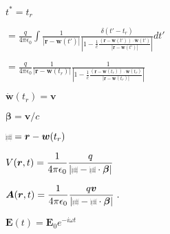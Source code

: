 \documentclass[12pt]{article}
\renewcommand{\vec}[1]{\boldsymbol{#1}}%
\def\lthtmlcheckvsize{\ifdim\ht\sizebox<\vsize 
  \ifdim\wd\sizebox<\hsize\expandafter\hfill\fi \expandafter\vfill
  \else\expandafter\vss\fi}%
\begin{document}
{\newpage\clearpage
{}%
$ t^* = t_r$%
\lthtmlindisplaymathZ
\lthtmlcheckvsize\clearpage}

{\newpage\clearpage
{}%
$\displaystyle = \frac{q}{4\pi\epsilon_0}\int \frac{ 1  }{|\vec{r} - \vec{w}(t')| }\frac{\delta(t' - t_r)}{\left| 1 - \frac{1}{c} \frac{ \left( \vec{r}  - \vec{w}(t')  \right)\cdot  \dot{\vec{w}}(t') }{ |\vec{r} - \vec{w}(t') | } \right|} dt'$%
\lthtmlindisplaymathZ
\lthtmlcheckvsize\clearpage}

{\newpage\clearpage
{}%
$\displaystyle = \frac{q}{4\pi\epsilon_0} \frac{ 1  }{|\vec{r} - \vec{w}(t_r)| }      \frac{1}{\left| 1 - \frac{1}{c} \frac{ \left( \vec{r}  - \vec{w}(t_r)  \right)\cdot  \dot{\vec{w}}(t_r) }{ |\vec{r} - \vec{w}(t_r) | } \right|}$%
\lthtmlindisplaymathZ
\lthtmlcheckvsize\clearpage}

{\newpage\clearpage
{}%
$ \dot{\vec{w}}(t_r) = \vec{v}$%
\lthtmlindisplaymathZ
\lthtmlcheckvsize\clearpage}

{\newpage\clearpage
{}%
$ \vec{\beta} = \vec{v}/c$%
\lthtmlindisplaymathZ
\lthtmlcheckvsize\clearpage}

{\newpage\clearpage
{}%
$ {\mbox{$\resizebox{.09in}{.08in}{\texttt{[image: fonts/ScriptR]}}$}}= \vec{r} - \vec{w}(t_r)$%
\lthtmlindisplaymathZ
\lthtmlcheckvsize\clearpage}

{\newpage\clearpage
{}%
$\displaystyle V(\vec{r}, t) = \frac{1}{4\pi\epsilon_0}    \frac{q}{\left| {\mbox{$\resizebox{.09in}{.08in}{\texttt{[image: fonts/ScriptR]}}$}}- {\mbox{$\resizebox{.09in}{.08in}{\texttt{[image: fonts/BoldR]}}$}}\cdot \vec{\beta} \right|}$%
\lthtmlindisplaymathZ
\lthtmlcheckvsize\clearpage}

{\newpage\clearpage
{}%
$\displaystyle \vec{A}(\vec{r}, t) = \frac{1}{4\pi\epsilon_0}    \frac{q\vec{v}}{\left| {\mbox{$\resizebox{.09in}{.08in}{\texttt{[image: fonts/ScriptR]}}$}}- {\mbox{$\resizebox{.09in}{.08in}{\texttt{[image: fonts/BoldR]}}$}}\cdot \vec{\beta} \right|} \;.$%
\lthtmlindisplaymathZ
\lthtmlcheckvsize\clearpage}

{\newpage\clearpage
{}%
$ \vec{E}(t)=\vec{E}_0 e^{-i\omega t}$%
\lthtmlindisplaymathZ
\lthtmlcheckvsize\clearpage}
\end{document}
